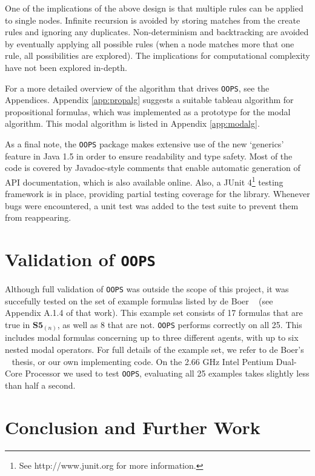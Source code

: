 \documentclass[11pt,a4paper]{article}
\begin{document}
One of the implications of the above design is that multiple rules can be applied to single nodes. Infinite recursion is avoided by storing matches from the create rules and ignoring any duplicates. Non-determinism and backtracking are avoided by eventually applying all possible rules (when a node matches more that one rule, all possibilities are explored). The implications for computational
complexity have not been explored in-depth.
\newline

For a more detailed overview of the algorithm that drives {\tt OOPS}, see the Appendices. Appendix \ref{app:propalg} suggests a suitable tableau algorithm for propositional formulas, which was implemented as a prototype for the modal algorithm. This modal algorithm is listed in Appendix \ref{app:modalg}.
\newline

As a final note, the {\tt OOPS} package makes extensive use of the new `generics' feature in Java 1.5 in
order to ensure readability and type safety. Most of the code is covered by Javadoc-style comments that enable automatic generation of API documentation, which is also available online. Also, a JUnit 4\footnote{See http://www.junit.org for more information.} testing framework is in place, providing partial testing coverage for the library. Whenever bugs were encountered, a unit test was added to the test suite to prevent them from reappearing.

\section{Validation of {\tt OOPS}}
Although full validation of {\tt OOPS} was outside the scope of this project, it was succefully tested on the set of example formulas listed by de Boer ~\cite{these} (see Appendix A.1.4 of that work). This example set  consists of 17 formulas that are true in $\textbf{S5}_{(n)}$, as well as 8 that are not. {\tt OOPS} performs correctly on all 25. This includes modal formulas concerning up to three different agents, with up to six nested modal operators. For full details of the example set, we refer to de Boer's ~\cite{these} thesis, or our own implementing code. On the 2.66 GHz Intel Pentium Dual-Core Processor we used to test {\tt OOPS}, evaluating all 25 examples takes slightly less than half a second.

\label{val}

\section{Conclusion and Further Work}
\label{more}
\end{document}

